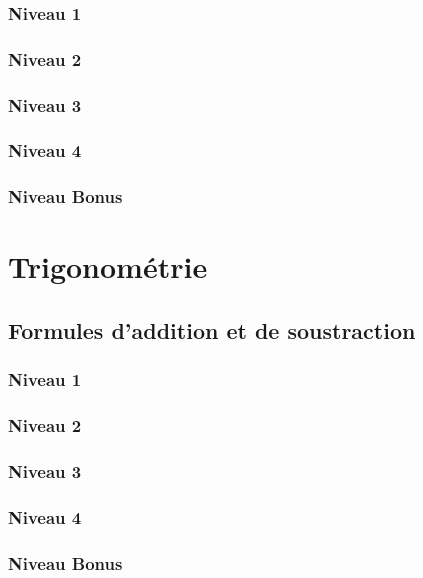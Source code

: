 \documentclass[a4paper]{report}
\begin{document}
			\subsection{Niveau 1}
		
			\subsection{Niveau 2}
		
			\subsection{Niveau 3}
			
			\subsection{Niveau 4}
			
			\subsection{Niveau Bonus}
	
	\chapter{Trigonométrie}
	
		\section{Formules d'addition et de soustraction}
		
			\subsection{Niveau 1}
		
			\subsection{Niveau 2}
		
			\subsection{Niveau 3}
			
			\subsection{Niveau 4}
			
			\subsection{Niveau Bonus}
		
\end{document}
